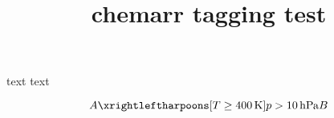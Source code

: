 \documentclass{article}
\title{chemarr tagging test}
\begin{document}
text
text

\[
  A
  \xrightleftharpoons[T \geq 400\,\mathrm{K}]{p > 10\,\mathrm{hPa}}
  B
\]
\end{document}
